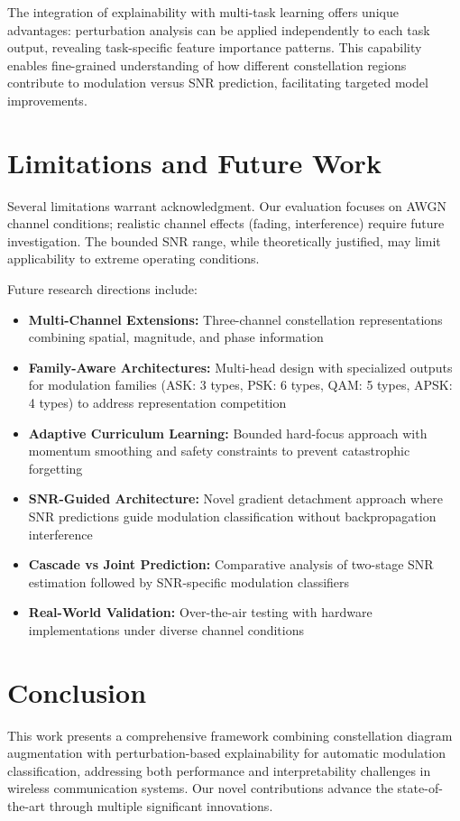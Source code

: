 \documentclass{ELSP}
\begin{document}
{{The integration of explainability with multi-task learning offers unique advantages: perturbation analysis can be applied independently to each task output, revealing task-specific feature importance patterns. This capability enables fine-grained understanding of how different constellation regions contribute to modulation versus SNR prediction, facilitating targeted model improvements.

\section{Limitations and Future Work}

Several limitations warrant acknowledgment. Our evaluation focuses on AWGN channel conditions; realistic channel effects (fading, interference) require future investigation. The bounded SNR range, while theoretically justified, may limit applicability to extreme operating conditions.

Future research directions include:
\begin{itemize}
    \item \textbf{Multi-Channel Extensions:} Three-channel constellation representations combining spatial, magnitude, and phase information
    \item \textbf{Family-Aware Architectures:} Multi-head design with specialized outputs for modulation families (ASK: 3 types, PSK: 6 types, QAM: 5 types, APSK: 4 types) to address representation competition
    \item \textbf{Adaptive Curriculum Learning:} Bounded hard-focus approach with momentum smoothing and safety constraints to prevent catastrophic forgetting
    \item \textbf{SNR-Guided Architecture:} Novel gradient detachment approach where SNR predictions guide modulation classification without backpropagation interference
    \item \textbf{Cascade vs Joint Prediction:} Comparative analysis of two-stage SNR estimation followed by SNR-specific modulation classifiers
    \item \textbf{Real-World Validation:} Over-the-air testing with hardware implementations under diverse channel conditions
\end{itemize}

\section{Conclusion}

This work presents a comprehensive framework combining constellation diagram augmentation with perturbation-based explainability for automatic modulation classification, addressing both performance and interpretability challenges in wireless communication systems. Our novel contributions advance the state-of-the-art through multiple significant innovations.

}}
\end{document}
